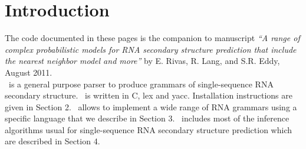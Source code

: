 \section{Introduction}

The code documented in these pages is the companion to manuscript
\textit{``A range of complex probabilistic models for RNA secondary
  structure prediction that include the nearest neighbor model and
  more''} by E. Rivas, R. Lang, and S.R. Eddy, August 2011.\\


\tornado\, is a general purpose parser to produce grammars of
single-sequence RNA secondary structure. \tornado\, is written in C, lex
and yacc.  Installation instructions are given in Section 2.
\tornado\, allows to implement a wide range of RNA grammars using a
specific language that we describe in Section 3. \tornado\, includes
most of the inference algorithms usual for single-sequence RNA
secondary structure prediction which are described in Section 4.


